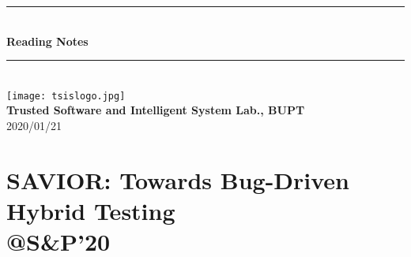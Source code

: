 \begin{titlepage}
 \newcommand{\HRule}{\rule{\linewidth}{0.5mm}}
	\center 

	\HRule \\[0.4cm]
	{\huge \bfseries Reading Notes}\\[0.4cm] 
	\HRule \\[1.5cm]
  \vspace{2em}
    \center
    \texttt{[image: tsislogo.jpg]}\\
      \vspace{2em}
		{\Large \bfseries 	Trusted Software and Intelligent System Lab., BUPT}\\
     
\vspace{2em}
	{\large 2020/01/21}\\[2cm] 

	\vfill 
\end{titlepage}




\tableofcontents
\clearpage



\section{SAVIOR: Towards Bug-Driven Hybrid Testing \\@S\&P'20
}

